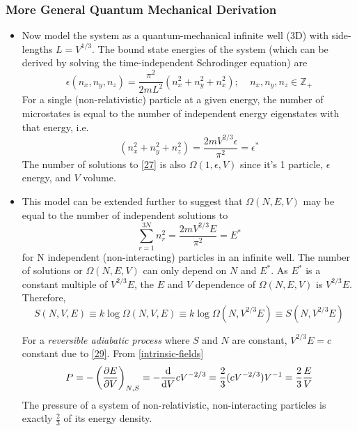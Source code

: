 \documentclass{article}
\begin{document}
\subsubsection{More General Quantum Mechanical Derivation}
\begin{itemize}
    \item Now model the system as a quantum-mechanical infinite well (3D) with side-lengths $L=V^{1/3}$. The bound state energies of the system (which can be derived by solving the time-independent Schrodinger equation) are
    \begin{equation}
        \epsilon(n_x,n_y,n_z)=\frac{\pi^2}{2mL^2}(n_x^2+n_y^2+n_x^2);\:\:\:\:\: n_x,n_y,n_z\in\mathbb{Z}_+
    \end{equation}
    For a single (non-relativistic) particle at a given energy, the number of microstates is equal to the number of independent energy eigenstates with that energy, i.e.
    \begin{equation}
        (n_x^2+n_y^2+n_z^2)=\frac{2mV^{2/3}\epsilon}{\pi^2}=\epsilon^*\label{27}
    \end{equation}
    The number of solutions to \eqref{27} is also $\Omega(1,\epsilon,V)$ since it's 1 particle, $\epsilon$ energy, and $V$ volume.
    \item This model can be extended further to suggest that $\Omega(N,E,V)$ may be equal to the number of independent solutions to
    \begin{equation}
        \sum_{r=1}^{3N}n_r^2=\frac{2mV^{2/3}E}{\pi^2}=E^*\label{28}
    \end{equation}
    for N independent (non-interacting) particles in an infinite well. The number of solutions or $\Omega(N,E,V)$ can only depend on $N$ and $E^*$. As $E^*$ is a constant multiple of $V^{2/3}E$, the $E$ and $V$ dependence of $\Omega(N,E,V)$ is $V^{2/3}E$. Therefore,
    \begin{equation}
        S(N,V,E)\equiv k\log\Omega(N,V,E)\equiv k\log\Omega(N,V^{2/3}E)\equiv S(N,V^{2/3}E)\label{29}
    \end{equation}
    \begin{derivation}
        For a \textit{reversible adiabatic process} where $S$ and $N$ are constant, $V^{2/3}E=c$ constant due to \eqref{29}. From \eqref{intrinsic-fields}
        \begin{equation}
            P=-\left(\partialderivative{E}{V}\right)_{N,S}=-\frac{\dd}{\dd V}cV^{-2/3}=\frac{2}{3}(cV^{-2/3})V^{-1}=\frac{2}{3}\frac{E}{V}\label{two-third:energy-density}
        \end{equation}
        The pressure of a system of non-relativistic, non-interacting particles is exactly $\frac{2}{3}$ of its energy density.
        

\end{derivation}
\end{itemize}
\end{document}
